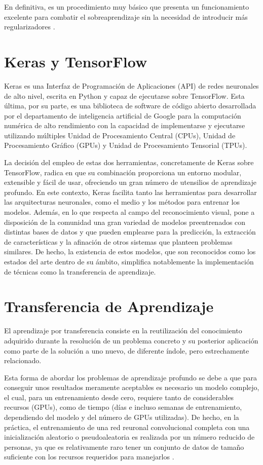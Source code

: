 En definitiva, es un procedimiento muy básico que presenta un funcionamiento excelente para combatir el sobreaprendizaje sin la necesidad de introducir más regularizadores \cite{CS231n}.

\section{Keras y TensorFlow}

Keras es una Interfaz de Programación de Aplicaciones (API) de redes neuronales de alto nivel, escrita en Python y capaz de ejecutarse sobre TensorFlow. Esta última, por su parte, es una biblioteca de software de código abierto desarrollada por el departamento de inteligencia artificial de Google para la computación numérica de alto rendimiento con la capacidad de implementarse y ejecutarse utilizando múltiples Unidad de Procesamiento Central (CPUs), Unidad de Procesamiento Gráfico (GPUs) y Unidad de Procesamiento Tensorial (TPUs).

La decisión del empleo de estas dos herramientas, concretamente de Keras sobre TensorFlow, radica en que su combinación proporciona un entorno modular, extensible y fácil de usar, ofreciendo un gran número de utensilios de aprendizaje profundo. En este contexto, Keras facilita tanto las herramientas para desarrollar las arquitecturas neuronales, como el medio y los métodos para entrenar los modelos. Además, en lo que respecta al campo del reconocimiento visual, pone a disposición de la comunidad una gran variedad de modelos preentrenados con distintas bases de datos y que pueden emplearse para la predicción, la extracción de características y la afinación de otros sistemas que planteen problemas similares. De hecho, la existencia de estos modelos, que son reconocidos como los estados del arte dentro de su ámbito, simplifica notablemente la implementación de técnicas como la transferencia de aprendizaje.

\section{Transferencia de Aprendizaje}

El aprendizaje por transferencia consiste en la reutilización del conocimiento adquirido durante la resolución de un problema concreto y su posterior aplicación como parte de la solución a uno nuevo, de diferente índole, pero estrechamente relacionado.

Esta forma de abordar los problemas de aprendizaje profundo se debe a que para conseguir unos resultados meramente aceptables es necesario un modelo complejo, el cual, para un entrenamiento desde cero, requiere tanto de considerables recursos (GPUs), como de tiempo (días e incluso semanas de entrenamiento, dependiendo del modelo y del número de GPUs utilizadas). De hecho, en la práctica, el entrenamiento de una red reuronal convolucional completa con una inicialización aleatorio o pseudoaleatoria es realizada por un número reducido de personas, ya que es relativamente raro tener un conjunto de datos de tamaño suficiente con los recursos requeridos para manejarlos \cite{CS231n}.  

